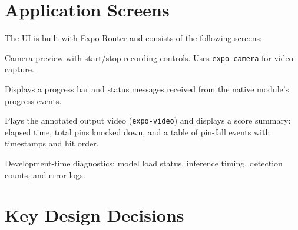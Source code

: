 \documentclass{zc-ust-hw}
\begin{document}
\section{Application Screens}

The UI is built with Expo Router and consists of the following screens:

\begin{description}[leftmargin=2cm, style=nextline]
    \item[\texttt{RecordScreen}] Camera preview with start/stop recording controls.
    Uses \texttt{expo-camera} for video capture.
    \item[\texttt{ProcessingScreen}] Displays a progress bar and status messages received from the native module's progress events.
    \item[\texttt{ResultScreen}] Plays the annotated output video (\texttt{expo-video}) and displays a score summary: elapsed time, total pins knocked down, and a table of pin-fall events with timestamps and hit order.
    \item[\texttt{DebugScreen}] Development-time diagnostics: model load status, inference timing, detection counts, and error logs.
\end{description}

\section{Key Design Decisions}
\end{document}

